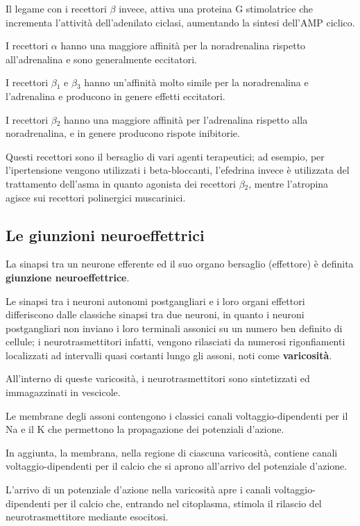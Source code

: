 \documentclass[]{article}
\begin{document}
Il legame con i recettori \textbf{\(\beta\)} invece, attiva una proteina
G stimolatrice che incrementa l'attività dell'adenilato ciclasi,
aumentando la sintesi dell'AMP ciclico.

I recettori \(\alpha\) hanno una maggiore affinità per la noradrenalina
rispetto all'adrenalina e sono generalmente eccitatori.

I recettori \(\beta\)\(_1\) e \(\beta\)\(_3\) hanno un'affinità molto
simile per la noradrenalina e l'adrenalina e producono in genere effetti
eccitatori.

I recettori \(\beta\)\(_2\) hanno una maggiore affinità per l'adrenalina
rispetto alla noradrenalina, e in genere producono rispote inibitorie.

Questi recettori sono il bersaglio di vari agenti terapeutici; ad
esempio, per l'ipertensione vengono utilizzati i beta-bloccanti,
l'efedrina invece è utilizzata del trattamento dell'asma in quanto
agonista dei recettori \(\beta\)\(_2\), mentre l'atropina agisce sui
recettori polinergici muscarinici.

\subsection{Le giunzioni
neuroeffettrici}\label{le-giunzioni-neuroeffettrici}

La sinapsi tra un neurone efferente ed il suo organo bersaglio
(effettore) è definita \textbf{giunzione neuroeffettrice}.

Le sinapsi tra i neuroni autonomi postgangliari e i loro organi
effettori differiscono dalle classiche sinapsi tra due neuroni, in
quanto i neuroni postgangliari non inviano i loro terminali assonici su
un numero ben definito di cellule; i neurotrasmettitori infatti, vengono
rilasciati da numerosi rigonfiamenti localizzati ad intervalli quasi
costanti lungo gli assoni, noti come \textbf{varicosità}.

All'interno di queste varicosità, i neurotrasmettitori sono sintetizzati
ed immagazzinati in vescicole.

Le membrane degli assoni contengono i classici canali
voltaggio-dipendenti per il Na e il K che permettono la propagazione dei
potenziali d'azione.

In aggiunta, la membrana, nella regione di ciascuna varicosità, contiene
canali voltaggio-dipendenti per il calcio che si aprono all'arrivo del
potenziale d'azione.

L'arrivo di un potenziale d'azione nella varicosità apre i canali
voltaggio-dipendenti per il calcio che, entrando nel citoplasma, stimola
il rilascio del neurotrasmettitore mediante esocitosi.
\end{document}
